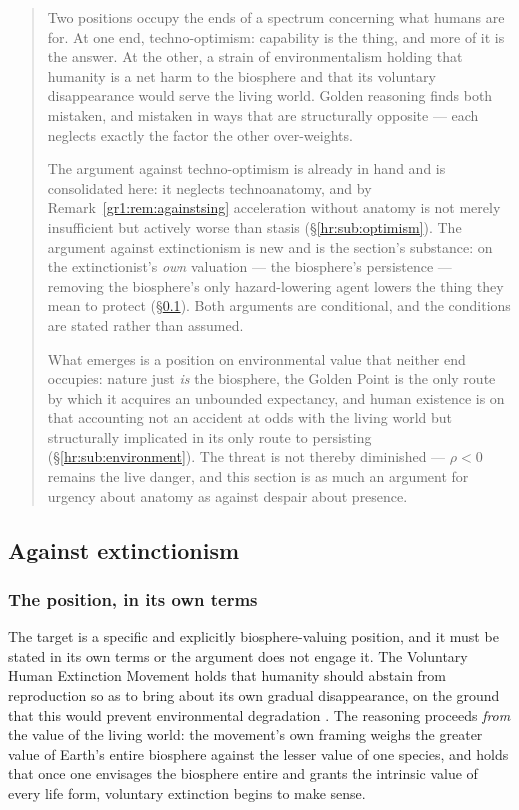 \documentclass[11pt]{article}
\numberwithin{equation}{section}
\theoremstyle{plain}
\theoremstyle{definition}
\theoremstyle{remark}
\begin{document}
\begin{quote}\small
Two positions occupy the ends of a spectrum concerning what humans are
for. At one end, techno-optimism: capability is the thing, and more of
it is the answer. At the other, a strain of environmentalism holding
that humanity is a net harm to the biosphere and that its voluntary
disappearance would serve the living world. Golden reasoning finds both
mistaken, and mistaken in ways that are structurally opposite --- each
neglects exactly the factor the other over-weights.

The argument against techno-optimism is already in hand and is
consolidated here: it neglects technoanatomy, and by
Remark~\ref{gr1:rem:againstsing} acceleration without anatomy is not
merely insufficient but actively worse than stasis
(\S\ref{hr:sub:optimism}). The argument against extinctionism is new and
is the section's substance: on the extinctionist's \emph{own} valuation
--- the biosphere's persistence --- removing the biosphere's only
hazard-lowering agent lowers the thing they mean to protect
(\S\ref{hr:sub:extinction}). Both arguments are conditional, and the
conditions are stated rather than assumed.

What emerges is a position on environmental value that neither end
occupies: nature just \emph{is} the biosphere, the Golden Point is the
only route by which it acquires an unbounded expectancy, and human
existence is on that accounting not an accident at odds with the living
world but structurally implicated in its only route to persisting
(\S\ref{hr:sub:environment}). The threat is not thereby diminished ---
$\rho<0$ remains the live danger, and this section is as much an
argument for urgency about anatomy as against despair about presence.
\end{quote}

\subsection{Against extinctionism}\label{hr:sub:extinction}

\subsubsection{The position, in its own terms}\label{hr:subsub:position}

The target is a specific and explicitly biosphere-valuing position, and
it must be stated in its own terms or the argument does not engage it.
The Voluntary Human Extinction Movement holds that humanity should
abstain from reproduction so as to bring about its own gradual
disappearance, on the ground that this would prevent environmental
degradation \cite{VHEMT}. The reasoning proceeds \emph{from} the value
of the living world: the movement's own framing weighs the greater value
of Earth's entire biosphere against the lesser value of one species, and
holds that once one envisages the biosphere entire and grants the
intrinsic value of every life form, voluntary extinction begins to make
sense.
\end{document}
